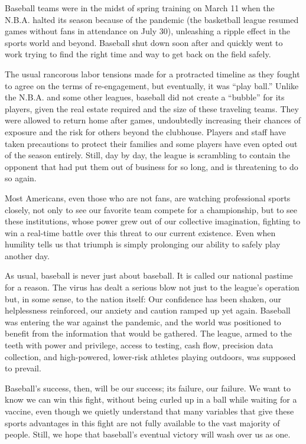 Baseball teams were in the midst of spring training on March 11 when the
N.B.A. halted its season because of the pandemic (the basketball league
resumed games without fans in attendance on July 30), unleashing a
ripple effect in the sports world and beyond. Baseball shut down soon
after and quickly went to work trying to find the right time and way to
get back on the field safely.

The usual rancorous labor tensions made for a protracted timeline as
they fought to agree on the terms of re-engagement, but eventually, it
was ``play ball.'' Unlike the N.B.A. and some other leagues, baseball
did not create a ``bubble'' for its players, given the real estate
required and the size of these traveling teams. They were allowed to
return home after games, undoubtedly increasing their chances of
exposure and the risk for others beyond the clubhouse. Players and staff
have taken precautions to protect their families and some players have
even opted out of the season entirely. Still, day by day, the league is
scrambling to contain the opponent that had put them out of business for
so long, and is threatening to do so again.

Most Americans, even those who are not fans, are watching professional
sports closely, not only to see our favorite team compete for a
championship, but to see these institutions, whose power grew out of our
collective imagination, fighting to win a real-time battle over this
threat to our current existence. Even when humility tells us that
triumph is simply prolonging our ability to safely play another day.

As usual, baseball is never just about baseball. It is called our
national pastime for a reason. The virus has dealt a serious blow not
just to the league's operation but, in some sense, to the nation itself:
Our confidence has been shaken, our helplessness reinforced, our anxiety
and caution ramped up yet again. Baseball was entering the war against
the pandemic, and the world was positioned to benefit from the
information that would be gathered. The league, armed to the teeth with
power and privilege, access to testing, cash flow, precision data
collection, and high-powered, lower-risk athletes playing outdoors, was
supposed to prevail.

Baseball's success, then, will be our success; its failure, our failure.
We want to know we can win this fight, without being curled up in a ball
while waiting for a vaccine, even though we quietly understand that many
variables that give these sports advantages in this fight are not fully
available to the vast majority of people. Still, we hope that baseball's
eventual victory will wash over us as one.

